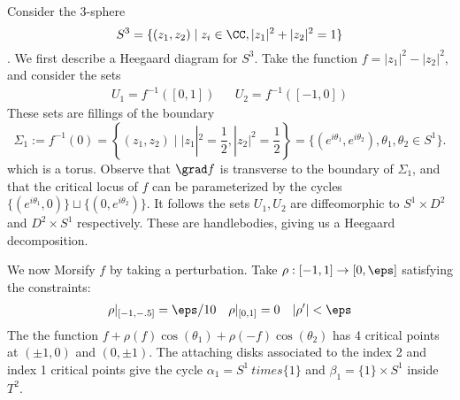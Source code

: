 

    \label{exm:heegaardDiagram3sphere}
    Consider the 3-sphere 
    \[S^3=\{(z_1, z_2)\;|\; z_i\in \CC, |z_1|^2+|z_2|^2=1\}\]. We first describe a Heegaard diagram for $S^3$. Take the function $f=|z_1|^2-|z_2|^2$, and consider the sets 
    \begin{align*}
        U_1=f^{-1}([0, 1]) && U_2=f^{-1}([-1, 0])
    \end{align*}
    These sets are fillings of the boundary 
    \[\Sigma_1:=f^{-1}(0)=\left\{(z_1, z_2)\;|\; |z_1|^2=\frac{1}{2}, |z_2|^2=\frac{1}{2}\right\}=\{(e^{i\theta_1}, e^{i\theta_2}), \theta_1, \theta_2\in S^1\}.\]
    which is a torus. Observe that $\grad f$ is transverse to the boundary of $\Sigma_1$, and that the critical locus of $f$ can be parameterized by the cycles $\{(e^{i\theta_1}, 0)\}\sqcup \{(0, e^{i\theta_2})\}$. It follows the sets $U_1, U_2$ are diffeomorphic to $S^1\times D^2$ and $D^2\times S^1$ respectively. These are handlebodies, giving us a Heegaard decomposition.

    We now Morsify $f$ by taking a perturbation. Take $\rho:[-1, 1]\to [0, \eps]$ satisfying the constraints:
    \begin{align*}
        \rho|_{[-1, -.5]}=\eps/10 && \rho|_{[0, 1]}=0 && |\rho'|<\eps
    \end{align*}
    The the function $f+ \rho(f)\cos(\theta_1)+\rho(-f)\cos(\theta_2)$ has 4 critical points at $(\pm 1 , 0)$ and $(0, \pm 1)$. The attaching disks associated to the index 2 and index 1 critical points give the  cycle $\alpha_1=S^1\ times \{1\}$ and $\beta_1=\{1\}\times S^1$ inside $T^2$. 
